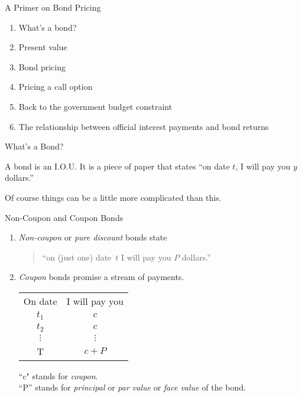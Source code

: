 \documentclass[professionalfonts,small]{beamer}
\begin{document}
\begin{frame}{A Primer on Bond Pricing}

\begin{enumerate}
\item What's a bond?
\item Present value
\item Bond pricing
\item Pricing a call option
\item Back to the government budget constraint
\item The relationship between official interest payments and bond returns
\end{enumerate}

\end{frame}

\begin{frame}{What's a Bond?}

\bigskip

A bond is an I.O.U.  It is a piece of paper that states
``on date $t$, I will pay you $y$ dollars.''

\bigskip

\bigskip

Of course things can be a little more complicated than this.

\end{frame}

\begin{frame}{Non-Coupon and Coupon Bonds}

\begin{enumerate}
\item {\em Non-coupon} or {\em pure discount} bonds state
\begin{quote}
``on (just one) date~$t$ I will pay you $P$
dollars.''
\end{quote}

\item {\em Coupon} bonds promise a stream of payments.

\smallskip

\begin{tabular}{cc}
On date   & I will pay you  \\
 $t_1$      &  $c$ \\
 $t_2$      &  $c$ \\
 $\vdots$   &  $\vdots$ \\
   T        &  $c+P$\\
\end{tabular}
\medskip

``c" stands for {\em coupon}.\\

``P'' stands for {\em principal} or {\em par value} or {\em face value} of the bond.

\end{enumerate}

\end{frame}
\end{document}
